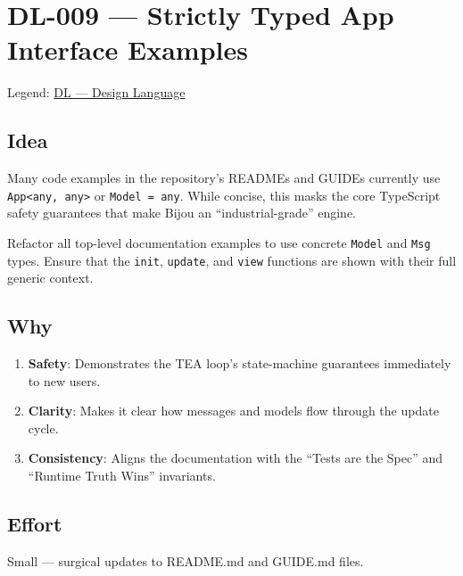 \chapter{DL-009 --- Strictly Typed App Interface Examples}\label{record-299}

\smallskip

Legend: \href{https://github.com/flyingrobots/bijou/blob/cbd70612140e7a450d764b3c7be1c6af878b99bc/docs/method/graveyard/legends/DL-design-language.md}{DL --- Design Language}

\section{Idea}\label{record-299-idea}

Many code examples in the repository's READMEs and GUIDEs currently use \texttt{A\allowbreak{}p\allowbreak{}p\allowbreak{}<\allowbreak{}a\allowbreak{}n\allowbreak{}y\allowbreak{},\allowbreak{} \allowbreak{}a\allowbreak{}n\allowbreak{}y\allowbreak{}>} or \texttt{M\allowbreak{}o\allowbreak{}d\allowbreak{}e\allowbreak{}l\allowbreak{} \allowbreak{}=\allowbreak{} \allowbreak{}a\allowbreak{}n\allowbreak{}y}. While concise, this masks the core TypeScript safety guarantees that make Bijou an ``industrial-grade'' engine.

Refactor all top-level documentation examples to use concrete \texttt{M\allowbreak{}o\allowbreak{}d\allowbreak{}e\allowbreak{}l} and \texttt{M\allowbreak{}s\allowbreak{}g} types. Ensure that the \texttt{i\allowbreak{}n\allowbreak{}i\allowbreak{}t}, \texttt{u\allowbreak{}p\allowbreak{}d\allowbreak{}a\allowbreak{}t\allowbreak{}e}, and \texttt{v\allowbreak{}i\allowbreak{}e\allowbreak{}w} functions are shown with their full generic context.

\section{Why}\label{record-299-why}

\begin{enumerate}
\def\labelenumi{\arabic{enumi}.}
\tightlist
\item
  \textbf{Safety}: Demonstrates the TEA loop's state-machine guarantees immediately to new users.
\item
  \textbf{Clarity}: Makes it clear how messages and models flow through the update cycle.
\item
  \textbf{Consistency}: Aligns the documentation with the ``Tests are the Spec'' and ``Runtime Truth Wins'' invariants.
\end{enumerate}

\section{Effort}\label{record-299-effort}

Small --- surgical updates to README.md and GUIDE.md files.

